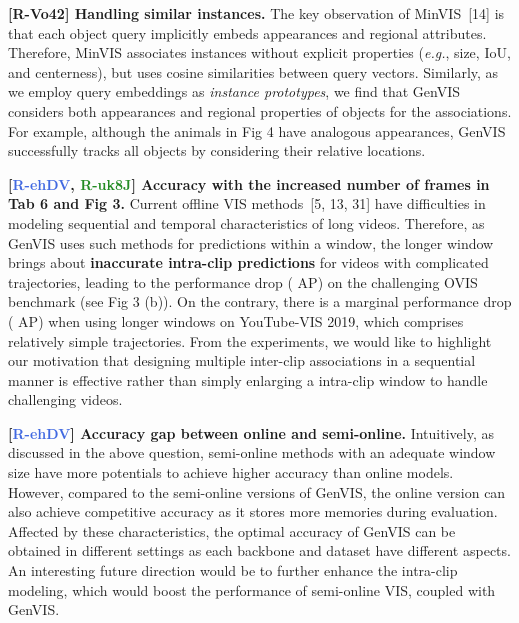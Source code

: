 \documentclass[10pt,twocolumn,letterpaper]{article}
\newcommand{\mfvis}{{\color{green}5}}
\newcommand{\vita}{{\color{green}13}}
\newcommand{\minvis}{{\color{green}14}}
\newcommand{\seqformer}{{\color{green}31}}
\newcommand{\rr}{{\textcolor{WildStrawberry}{\textbf{R-Vo42}}}}
\newcommand{\rb}{{\textcolor{RoyalBlue}{\textbf{R-ehDV}}}}
\newcommand{\rg}{{\textcolor{ForestGreen}{\textbf{R-uk8J}}}}
\begin{document}
\noindent \textbf{[\rr] Handling similar instances.}
The key observation of MinVIS~[\minvis{}] is that each object query implicitly embeds appearances and regional attributes.
Therefore, MinVIS associates instances without explicit properties (\emph{e.g.}, size, IoU, and centerness), but uses cosine similarities between query vectors.
Similarly, as we employ query embeddings as \textit{instance prototypes}, we find that GenVIS considers both appearances and regional properties of objects for the associations.
For example, although the animals in Fig {\color{Red}4} have analogous appearances, GenVIS successfully tracks all objects by considering their relative locations.



\noindent \textbf{[\rb, \rg] Accuracy with the increased number of frames in Tab 6 and Fig 3.}
Current offline VIS methods~[\mfvis{}, \vita{}, \seqformer{}] have difficulties in modeling sequential and temporal characteristics of long videos.
Therefore, as GenVIS uses such methods for predictions within a window, the longer window brings about \textbf{inaccurate intra-clip predictions} for videos with complicated trajectories, leading to the performance drop ( AP) on the challenging OVIS benchmark (see Fig {\color{Red}3} (b)).
On the contrary, there is a marginal performance drop ( AP) when using longer windows on YouTube-VIS 2019, which comprises relatively simple trajectories.
From the experiments, we would like to highlight our motivation that designing multiple inter-clip associations in a sequential manner is effective rather than simply enlarging a intra-clip window to handle challenging videos.





\noindent \textbf{[\rb] Accuracy gap between online and semi-online.}
Intuitively, as discussed in the above question, semi-online methods with an adequate window size have more potentials to achieve higher accuracy than online models.
However, compared to the semi-online versions of GenVIS, the online version can also achieve competitive accuracy as it stores more memories during evaluation.
Affected by these characteristics, the optimal accuracy of GenVIS can be obtained in different settings as each backbone and dataset have different aspects.
An interesting future direction would be to further enhance the intra-clip modeling, which would boost the performance of semi-online VIS, coupled with GenVIS.
\end{document}
